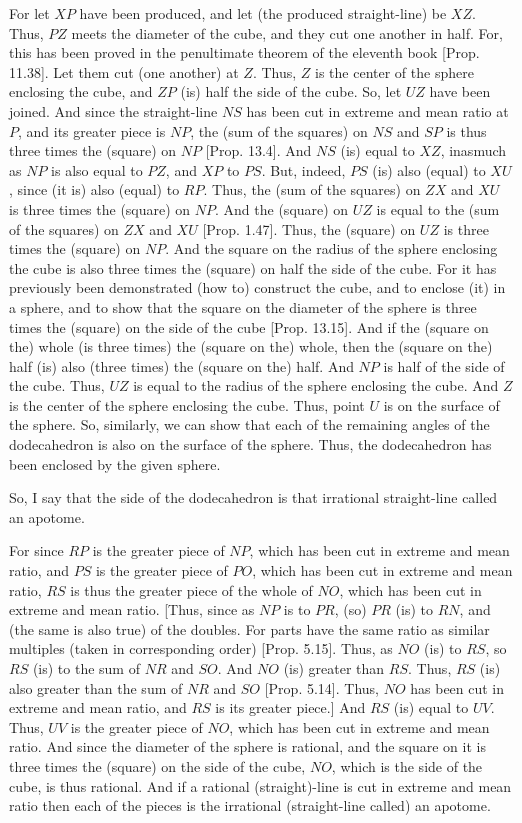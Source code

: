 \begin{Parallel}{}{}
{For let $XP$ have been produced, and let (the produced straight-line) be $XZ$. Thus, $PZ$ meets
the diameter of the cube, and they cut one another in half.
For, this has been proved in the penultimate theorem of the eleventh book [Prop. 11.38]. Let them cut (one another) at $Z$. Thus, $Z$ is the
center of the sphere enclosing the cube, and $ZP$ (is) half the side of
the cube. So, let $UZ$ have been joined. And since the straight-line 
$NS$ has been cut in extreme and mean ratio at $P$, and its greater piece
is $NP$, the (sum of the squares) on $NS$ and $SP$
is thus three times the (square) on $NP$ [Prop. 13.4]. And $NS$ (is)
equal to $XZ$, inasmuch as $NP$ is also equal to $PZ$, and
$XP$ to $PS$. But, indeed, $PS$ (is) also (equal) to $XU$,
since (it is) also (equal) to $RP$. Thus, the (sum of the squares) on 
$ZX$ and $XU$ is three times the (square) on $NP$.
And  the (square)
on $UZ$ is equal to the (sum of the squares) on $ZX$ and $XU$ [Prop. 1.47].  Thus, the (square) on $UZ$ is three times the
(square) on $NP$. 
 And the square on the
radius of the sphere enclosing the cube is also three times the (square) on half
the side of the cube. For it has previously been demonstrated (how to) construct 
the cube, and to enclose (it) in a sphere, and to show that the square on
the diameter of the sphere is three times the (square) on the
side of the cube [Prop. 13.15]. And if the (square on the) whole (is three
times) the (square on the) whole, then the (square on the) half (is) also (three times) the (square on the) half. 
And $NP$ is half of the side of the cube. Thus, $UZ$ is equal to
the radius of the sphere enclosing the cube. And $Z$ is the center of the
sphere enclosing the cube.
Thus, point $U$
is on the surface of the sphere. So, similarly, we can show that each of
the remaining angles of the dodecahedron is also  on the surface of the sphere. 
Thus, the dodecahedron has been enclosed by the given sphere.

So, I say that the side of the dodecahedron is that irrational straight-line
called an apotome.

For since  $RP$ is the greater piece of $NP$, which has been cut in extreme and mean ratio, and $PS$ is the greater piece of $PO$, which
has been cut in extreme and mean ratio,  $RS$ is thus the greater piece of the
whole of $NO$, which has been cut in extreme and mean ratio.
[Thus, since as $NP$ is to $PR$, (so) $PR$ (is) to $RN$, and  (the same is also true) of the doubles.
For parts have the same ratio as similar multiples (taken in corresponding
order) [Prop. 5.15]. Thus, as $NO$ (is) to $RS$, so $RS$
(is) to the sum of $NR$ and $SO$. And $NO$
(is) greater than $RS$. Thus, $RS$ (is) also
greater than the sum of $NR$ and $SO$ [Prop. 5.14]. Thus, $NO$
has been cut in extreme and mean ratio, and  $RS$ is its greater piece.]
And $RS$ (is) equal to $UV$. Thus, $UV$ is the greater piece of
$NO$, which has been cut in extreme and mean ratio. 
And since the diameter of the sphere is rational, and the square on it
is three times the (square) on the side of the cube,  $NO$, which is
the side of the cube, is thus rational. And if a rational (straight)-line
is cut in extreme and mean ratio then each of the
pieces is the irrational (straight-line called) an apotome.

}
\end{Parallel}
